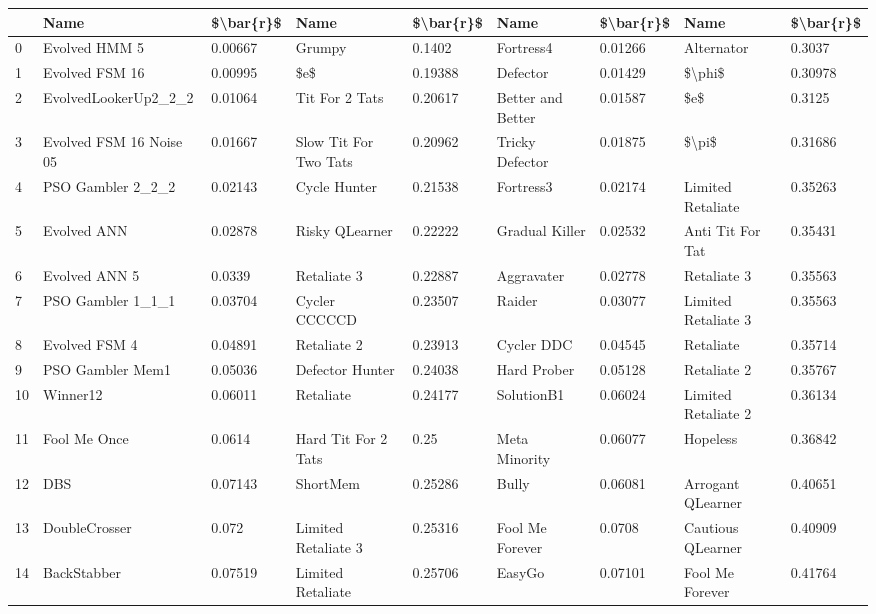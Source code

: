 \begin{tabular}{lllllllll}
\toprule
{} &                     Name & \$\textbackslash bar\{r\}\$ &                   Name & \$\textbackslash bar\{r\}\$ &               Name & \$\textbackslash bar\{r\}\$ &                 Name & \$\textbackslash bar\{r\}\$ \\
\midrule
0  &            Evolved HMM 5 &   0.00667 &                 Grumpy &    0.1402 &          Fortress4 &   0.01266 &           Alternator &    0.3037 \\
1  &           Evolved FSM 16 &   0.00995 &                    \$e\$ &   0.19388 &           Defector &   0.01429 &               \$\textbackslash phi\$ &   0.30978 \\
2  &     EvolvedLookerUp2\_2\_2 &   0.01064 &         Tit For 2 Tats &   0.20617 &  Better and Better &   0.01587 &                  \$e\$ &    0.3125 \\
3  &  Evolved FSM 16 Noise 05 &   0.01667 &  Slow Tit For Two Tats &   0.20962 &    Tricky Defector &   0.01875 &                \$\textbackslash pi\$ &   0.31686 \\
4  &        PSO Gambler 2\_2\_2 &   0.02143 &           Cycle Hunter &   0.21538 &          Fortress3 &   0.02174 &    Limited Retaliate &   0.35263 \\
5  &              Evolved ANN &   0.02878 &         Risky QLearner &   0.22222 &     Gradual Killer &   0.02532 &     Anti Tit For Tat &   0.35431 \\
6  &            Evolved ANN 5 &    0.0339 &            Retaliate 3 &   0.22887 &         Aggravater &   0.02778 &          Retaliate 3 &   0.35563 \\
7  &        PSO Gambler 1\_1\_1 &   0.03704 &          Cycler CCCCCD &   0.23507 &             Raider &   0.03077 &  Limited Retaliate 3 &   0.35563 \\
8  &            Evolved FSM 4 &   0.04891 &            Retaliate 2 &   0.23913 &         Cycler DDC &   0.04545 &            Retaliate &   0.35714 \\
9  &         PSO Gambler Mem1 &   0.05036 &        Defector Hunter &   0.24038 &        Hard Prober &   0.05128 &          Retaliate 2 &   0.35767 \\
10 &                 Winner12 &   0.06011 &              Retaliate &   0.24177 &         SolutionB1 &   0.06024 &  Limited Retaliate 2 &   0.36134 \\
11 &             Fool Me Once &    0.0614 &    Hard Tit For 2 Tats &      0.25 &      Meta Minority &   0.06077 &             Hopeless &   0.36842 \\
12 &                      DBS &   0.07143 &               ShortMem &   0.25286 &              Bully &   0.06081 &    Arrogant QLearner &   0.40651 \\
13 &            DoubleCrosser &     0.072 &    Limited Retaliate 3 &   0.25316 &    Fool Me Forever &    0.0708 &    Cautious QLearner &   0.40909 \\
14 &              BackStabber &   0.07519 &      Limited Retaliate &   0.25706 &             EasyGo &   0.07101 &      Fool Me Forever &   0.41764 \\
\bottomrule
\end{tabular}

